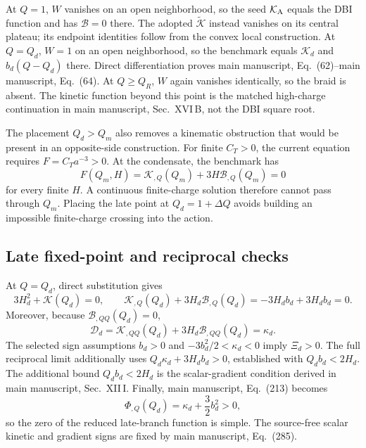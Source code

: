\documentclass[aps,prd,reprint,onecolumn,notitlepage,nofootinbib,longbibliography,floatfix]{revtex4-2}
\theoremstyle{scstyle}
\theoremstyle{definition}
\theoremstyle{remark}
\newcommand{\cK}{\mathcal K}
\newcommand{\cB}{\mathcal B}
\newcommand{\cD}{\mathcal D}
\newcommand{\Kt}{\widetilde{\mathcal K}}
\begin{document}
At $Q=1$, $W$ vanishes on an open neighborhood, so the seed $\cK_{\rm A}$ equals the DBI function and has $\cB=0$ there. The adopted $\Kt$ instead vanishes on its central plateau; its endpoint identities follow from the convex local construction. At $Q=Q_d$, $W=1$ on an open neighborhood, so the benchmark equals $\cK_d$ and $b_d(Q-Q_d)$ there. Direct differentiation proves main manuscript, Eq.~(62)--main manuscript, Eq.~(64). At $Q\ge Q_R$, $W$ again vanishes identically, so the braid is absent. The kinetic function beyond this point is the matched high-charge continuation in main manuscript, Sec.~XVI\,B, not the DBI square root.

The placement $Q_d>Q_m$ also removes a kinematic obstruction that would be present in an opposite-side construction. For finite $C_T>0$, the current equation requires $F=C_Ta^{-3}>0$. At the condensate, the benchmark has
\begin{equation}
F(Q_m,H)=\cK_{,Q}(Q_m)+3H\cB_{,Q}(Q_m)=0
\label{eq:benchmarkcrossingobstruction}
\end{equation}
for every finite $H$. A continuous finite-charge solution therefore cannot pass through $Q_m$. Placing the late point at $Q_d=1+\Delta Q$ avoids building an impossible finite-charge crossing into the action.

\subsection{Late fixed-point and reciprocal checks}

At $Q=Q_d$, direct substitution gives
\begin{equation}
3H_d^2+\cK(Q_d)=0,
\qquad
\cK_{,Q}(Q_d)+3H_d\cB_{,Q}(Q_d)
=-3H_db_d+3H_db_d=0.
\label{eq:benchmarkdSproof}
\end{equation}
Moreover, because $\cB_{,QQ}(Q_d)=0$,
\begin{equation}
\cD_d
=\cK_{,QQ}(Q_d)+3H_d\cB_{,QQ}(Q_d)
=\kappa_d.
\label{eq:benchmarkDproof}
\end{equation}
The selected sign assumptions $b_d>0$ and $-3b_d^2/2<\kappa_d<0$ imply $\Xi_d>0$. The full reciprocal limit additionally uses $Q_d\kappa_d+3H_db_d>0$, established with $Q_db_d<2H_d$. The additional bound $Q_db_d<2H_d$ is the scalar-gradient condition derived in main manuscript, Sec.~XII\,I. Finally, main manuscript, Eq.~(213) becomes
\begin{equation}
\Phi_{,Q}(Q_d)=\kappa_d+\frac32b_d^2>0,
\label{eq:benchmarkPhiproof}
\end{equation}
so the zero of the reduced late-branch function is simple. The source-free scalar kinetic and gradient signs are fixed by main manuscript, Eq.~(285).
\end{document}

